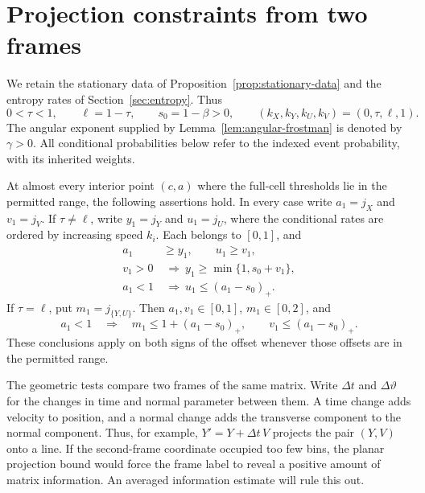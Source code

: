 \section{Projection constraints from two frames}
\label{sec:projections}

We retain the stationary data of
Proposition~\ref{prop:stationary-data} and the entropy rates of
Section~\ref{sec:entropy}. Thus
\[
 0<\tau<1,\qquad \ell=1-\tau,\qquad
 s_0=1-\beta>0,\qquad
 (k_X,k_Y,k_U,k_V)=(0,\tau,\ell,1).
\]
The angular exponent supplied by Lemma~\ref{lem:angular-frostman}
is denoted by $\gamma>0$.
All conditional probabilities below refer to the indexed event
probability, with its inherited weights.

\begin{proposition}
\label{prop:projection-rates}
At almost every interior point $(c,a)$ where the full-cell thresholds
lie in the permitted range, the following assertions hold.
In every case write $a_1=j_X$ and $v_1=j_V$.
If $\tau\ne\ell$, write $y_1=j_Y$ and $u_1=j_U$,
where the conditional rates are ordered by increasing speed $k_i$.
Each belongs to $[0,1]$, and
\begin{equation}
\begin{split}
 a_1&\ge y_1,\qquad u_1\ge v_1,\\
 v_1>0&\ \Longrightarrow\ y_1\ge\min\{1,s_0+v_1\},\\
 a_1<1&\ \Longrightarrow\ u_1\le(a_1-s_0)_+.
\end{split}
\label{pr:distinct-constraints}
\end{equation}
If $\tau=\ell$, put $m_1=j_{\{Y,U\}}$.
Then $a_1,v_1\in[0,1]$, $m_1\in[0,2]$, and
\begin{equation}
 a_1<1\quad\Longrightarrow\quad
 m_1\le1+(a_1-s_0)_+,
 \qquad v_1\le(a_1-s_0)_+.
\label{pr:tied-constraints}
\end{equation}
These conclusions apply on both signs of the offset whenever those
offsets are in the permitted range.
\end{proposition}

The geometric tests compare two frames of the same matrix. Write
$\Delta t$ and $\Delta\vartheta$ for the changes in time and normal
parameter between them. A time change adds velocity to position, and
a normal change adds the transverse component to the normal component. Thus, for example,
$Y'=Y+\Delta t\,V$ projects the pair $(Y,V)$ onto a line. If the
second-frame coordinate occupied too few bins, the planar projection
bound would force the frame label to reveal a positive amount of matrix
information. An averaged information estimate will rule this out.


